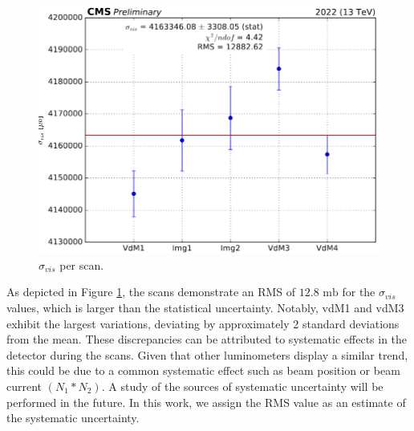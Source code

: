\begin{center}
  \begin{figure}[ht]
    \centering
    \includegraphics[scale=0.45]{Chapter4/xsec_perscan_v2.png}
    \caption[$\sigma_{vis}$ per Scan]{ $\sigma_{vis}$  per scan.} 
    \label{sigmavis_perscan}
  \end{figure}
\end{center}

As depicted in Figure \ref{sigmavis_perscan}, the scans demonstrate an RMS of $12.8 \text{ mb}$ for the $\sigma_{vis}$ values, which is larger than the statistical uncertainty. Notably, vdM1 and vdM3 exhibit the largest variations, deviating by approximately 2 standard deviations from the mean. These discrepancies can be attributed to systematic effects in the detector during the scans. Given that other luminometers display a similar trend, this could be due to a common systematic effect such as beam position or beam current $(N_{1}*N_{2})$. A study of the sources of systematic uncertainty will be performed in the future. In this work, we assign the RMS value as an estimate of the systematic uncertainty.

